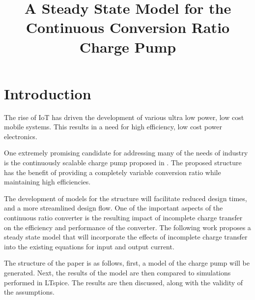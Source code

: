 \documentclass[conference]{IEEEtran}
\title{A Steady State Model for the Continuous Conversion Ratio Charge Pump}
\begin{document}
	\maketitle
	\section{Introduction}
	The rise of IoT has driven the development of various ultra low power, low cost mobile systems. This results in a need for high efficiency, low cost power electronics.
	
	One extremely promising candidate for addressing many of the needs of industry is the continuously scalable charge pump proposed in \cite{Butzen2019	}. The proposed structure has the benefit of providing a completely variable conversion ratio while maintaining high efficiencies. 
	
	The development of models for the structure will facilitate reduced design times, and a more streamlined design flow. One of the important aspects of the continuous ratio converter is the resulting impact of incomplete charge transfer on the efficiency and performance of the converter. The following work proposes a steady state model that will incorporate the effects of incomplete charge transfer into the existing equations for input and output current.
	
	The structure of the paper is as follows, first, a model of the charge pump will be generated. Next, the results of the model are then compared to simulations performed in LTspice. The results are then discussed, along with the validity of the assumptions.
\end{document}
